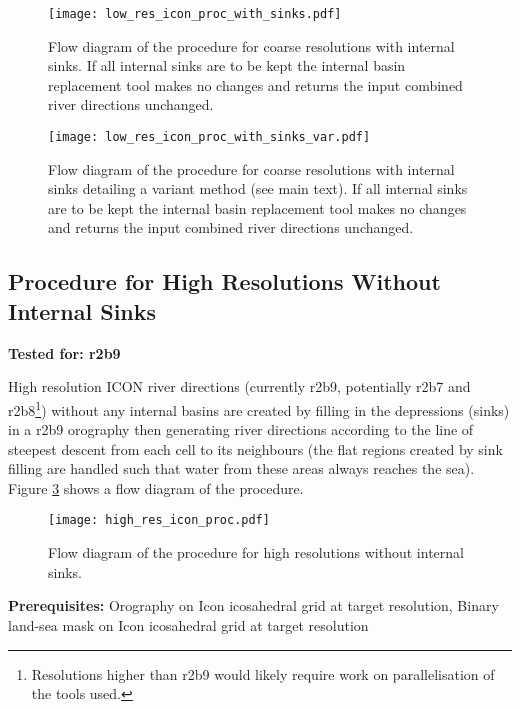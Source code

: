 \documentclass{article}
\begin{document}
\begin{figure}
\texttt{[image: low\_res\_icon\_proc\_with\_sinks.pdf]}
\caption{Flow diagram of the procedure for coarse resolutions with internal sinks. If all internal sinks are to be kept the internal basin replacement tool makes no changes and returns the input combined river directions unchanged.}
\label{fig-low-res-icon-proc-with-sinks}
\end{figure}

\begin{figure}
\texttt{[image: low\_res\_icon\_proc\_with\_sinks\_var.pdf]}
\caption{Flow diagram of the procedure for coarse resolutions with internal sinks detailing a variant method (see main text). If all internal sinks are to be kept the internal basin replacement tool makes no changes and returns the input combined river directions unchanged.}
\label{fig-low-res-icon-proc-with-sinks-var}
\end{figure}


\subsection{Procedure for High Resolutions Without Internal Sinks}
\noindent\textbf{Tested for: r2b9}

\noindent High resolution ICON river directions (currently r2b9, potentially r2b7 and r2b8\footnote{Resolutions higher than r2b9 would likely require work on parallelisation of the tools used.}) without any internal basins are created by filling in the depressions (sinks) in a r2b9 orography then generating river directions according to the line of steepest descent from each cell to its neighbours (the flat regions created by sink filling are handled such that water from these areas always reaches the sea). Figure \ref{fig-high-res-icon-proc} shows a flow diagram of the procedure. \newline

\begin{figure}
\texttt{[image: high\_res\_icon\_proc.pdf]}
\caption{Flow diagram of the procedure for high resolutions without internal sinks.}
\label{fig-high-res-icon-proc}
\end{figure}

\noindent\textbf{Prerequisites:} Orography on Icon icosahedral grid at target resolution, Binary land-sea mask on Icon icosahedral grid at target resolution
\end{document}
